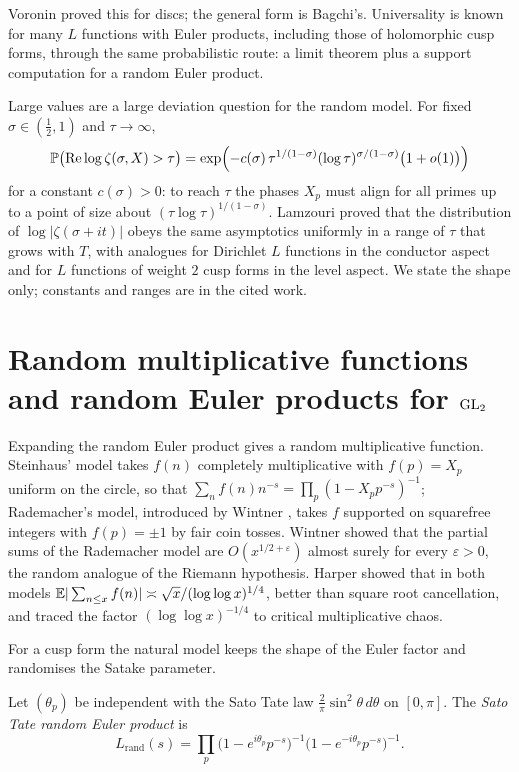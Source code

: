 Voronin \cite{voronin1975} proved this for discs; the general form is Bagchi's. Universality is known for many $L$ functions with Euler products, including those of holomorphic cusp forms, through the same probabilistic route: a limit theorem plus a support computation for a random Euler product.

Large values are a large deviation question for the random model. For fixed $\sigma\in(\frac12,1)$ and $\tau\to\infty$,
\[
\mathbb{P}\bigl(\operatorname{Re}\log\zeta(\sigma,X)>\tau\bigr) = \exp\Bigl(-c(\sigma)\,\tau^{1/(1-\sigma)}(\log\tau)^{\sigma/(1-\sigma)}\bigl(1+o(1)\bigr)\Bigr)
\]
for a constant $c(\sigma)>0$: to reach $\tau$ the phases $X_p$ must align for all primes up to a point of size about $(\tau\log\tau)^{1/(1-\sigma)}$. Lamzouri \cite{lamzouri2011} proved that the distribution of $\log|\zeta(\sigma+it)|$ obeys the same asymptotics uniformly in a range of $\tau$ that grows with $T$, with analogues for Dirichlet $L$ functions in the conductor aspect and for $L$ functions of weight $2$ cusp forms in the level aspect. We state the shape only; constants and ranges are in the cited work.

\section{Random multiplicative functions and random Euler products for \texorpdfstring{$\mathrm{GL}_2$}{GL2}}

Expanding the random Euler product gives a random multiplicative function. Steinhaus' model takes $f(n)$ completely multiplicative with $f(p) = X_p$ uniform on the circle, so that $\sum_n f(n)n^{-s} = \prod_p(1-X_pp^{-s})^{-1}$; Rademacher's model, introduced by Wintner \cite{wintner1944}, takes $f$ supported on squarefree integers with $f(p)=\pm1$ by fair coin tosses. Wintner showed that the partial sums of the Rademacher model are $O(x^{1/2+\varepsilon})$ almost surely for every $\varepsilon>0$, the random analogue of the Riemann hypothesis. Harper \cite{harper2020} showed that in both models $\mathbb{E}|\sum_{n\le x}f(n)| \asymp \sqrt x/(\log\log x)^{1/4}$, better than square root cancellation, and traced the factor $(\log\log x)^{-1/4}$ to critical multiplicative chaos.

For a cusp form the natural model keeps the shape of the Euler factor and randomises the Satake parameter.

\begin{definition}
Let $(\theta_p)$ be independent with the Sato Tate law $\frac{2}{\pi}\sin^2\theta\,d\theta$ on $[0,\pi]$. The \emph{Sato Tate random Euler product} is
\[
L_{\mathrm{rand}}(s) = \prod_p \bigl(1-e^{i\theta_p}p^{-s}\bigr)^{-1}\bigl(1-e^{-i\theta_p}p^{-s}\bigr)^{-1}.
\]
\end{definition}

